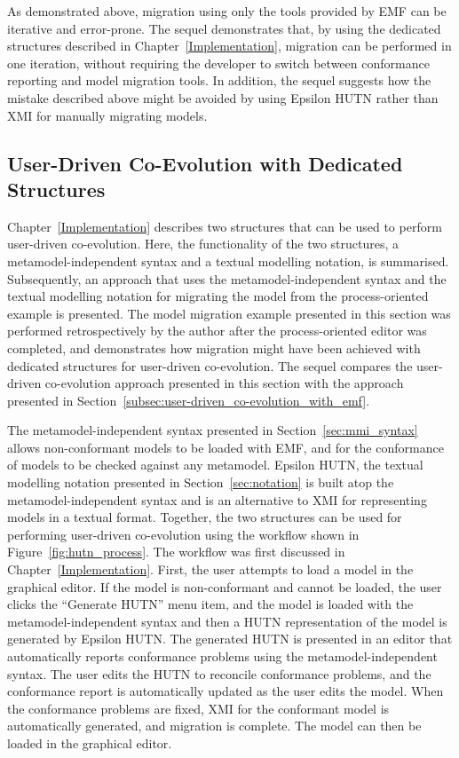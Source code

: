 As demonstrated above, migration using only the tools provided by EMF can be iterative and error-prone. The sequel demonstrates that, by using the dedicated structures described in Chapter~\ref{Implementation}, migration can be performed in one iteration, without requiring the developer to switch between conformance reporting and model migration tools. In addition, the sequel suggests how the mistake described above might be avoided by using Epsilon HUTN rather than XMI for manually migrating models.

\subsection{User-Driven Co-Evolution with Dedicated Structures}
\label{subsec:user-driven_co-evolution_with_dedicated_structures}

Chapter~\ref{Implementation} describes two structures that can be used to perform user-driven co-evolution. Here, the functionality of the two structures, a metamodel-independent syntax and a textual modelling notation, is summarised. Subsequently, an approach that uses the metamodel-independent syntax and the textual modelling notation for migrating the model from the process-oriented example is presented. The model migration example presented in this section was performed retrospectively by the author after the process-oriented editor was completed, and demonstrates how migration might have been achieved with dedicated structures for user-driven co-evolution. The sequel compares the user-driven co-evolution approach presented in this section with the approach presented in Section~\ref{subsec:user-driven_co-evolution_with_emf}.

The metamodel-independent syntax presented in Section~\ref{sec:mmi_syntax} allows non-conformant models to be loaded with EMF, and for the conformance of models to be checked against any metamodel. Epsilon HUTN, the textual modelling notation presented in Section~\ref{sec:notation} is built atop the metamodel-independent syntax and is an alternative to XMI for representing models in a textual format. Together, the two structures can be used for performing user-driven co-evolution using the workflow shown in Figure~\ref{fig:hutn_process}. The workflow was first discussed in Chapter~\ref{Implementation}. First, the user attempts to load a model in the graphical editor. If the model is non-conformant and cannot be loaded, the user clicks the ``Generate HUTN'' menu item, and the model is loaded with the metamodel-independent syntax and then a HUTN representation of the model is generated by Epsilon HUTN. The generated HUTN is presented in an editor that automatically reports conformance problems using the metamodel-independent syntax. The user edits the HUTN to reconcile conformance problems, and the conformance report is automatically updated as the user edits the model. When the conformance problems are fixed, XMI for the conformant model is automatically generated, and migration is complete. The model can then be loaded in the graphical editor.

